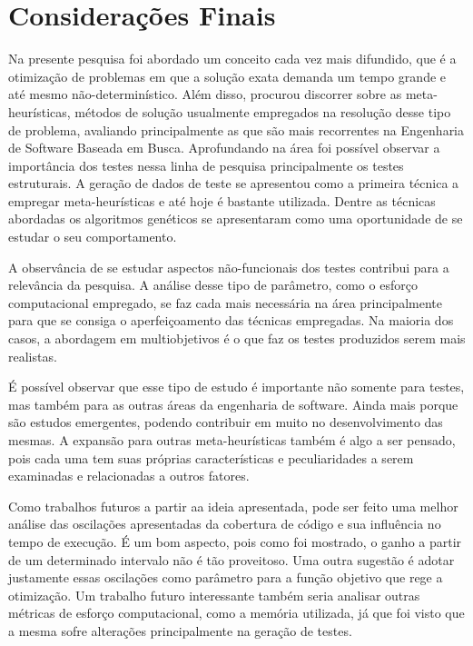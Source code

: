 \chapter[Considerações Finais]{Considerações Finais}
\label{conclusoes}

Na presente pesquisa foi abordado um conceito cada vez mais difundido, que é a otimização de problemas em que a solução exata demanda um tempo grande e até mesmo não-determinístico. Além disso, procurou discorrer sobre as meta-heurísticas, métodos de solução usualmente empregados na resolução desse tipo de problema, avaliando principalmente as que são mais recorrentes na Engenharia de Software Baseada em Busca. Aprofundando na área foi possível observar a importância dos testes nessa linha de pesquisa principalmente os testes estruturais. A geração de dados de teste se apresentou como a primeira técnica a empregar meta-heurísticas e até hoje é bastante utilizada. Dentre as técnicas abordadas os algoritmos genéticos se apresentaram como uma oportunidade de se estudar o seu comportamento.

A observância de se estudar aspectos não-funcionais dos testes contribui para a relevância da pesquisa. A análise desse tipo de parâmetro, como o esforço computacional empregado, se faz cada mais necessária na área principalmente para que se consiga o aperfeiçoamento das técnicas empregadas. Na maioria dos casos, a abordagem em multiobjetivos é o que faz os testes produzidos serem mais realistas. 

É possível observar que esse tipo de estudo é importante não somente para testes, mas também para as outras áreas da engenharia de software. Ainda mais porque são estudos emergentes, podendo contribuir em muito no desenvolvimento das mesmas. A expansão para outras meta-heurísticas também é algo a ser pensado, pois cada uma tem suas próprias características e peculiaridades a serem examinadas e relacionadas a outros fatores.

Como trabalhos futuros a partir aa ideia apresentada, pode ser feito uma melhor análise das oscilações apresentadas da cobertura de código e sua influência no tempo de execução. É um bom aspecto, pois como foi mostrado, o ganho a partir de um determinado intervalo não é tão proveitoso. Uma outra sugestão é adotar justamente essas oscilações como parâmetro para a função objetivo que rege a otimização. Um trabalho futuro interessante também seria analisar outras métricas de esforço computacional, como a memória utilizada, já que foi visto que a mesma sofre alterações principalmente na geração de testes. 
